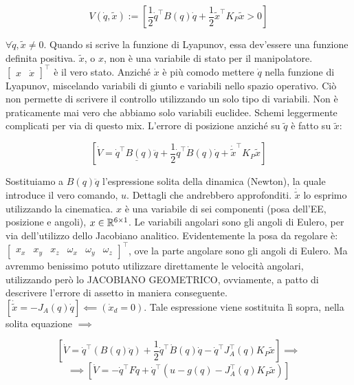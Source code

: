 \[
	V(\dot{q},\tilde{x}) := [\frac{1}{2}\dot{q}^\top B(q)\dot{q} + \frac{1}{2}\tilde{x}^\top K_P\tilde{x} > 0]
\]

$\forall \dot{q},\tilde{x}\neq 0$. Quando si scrive la funzione di Lyapunov, essa dev'essere una funzione definita positiva. $\tilde{x}$, o $x$, non è una variabile di stato per il manipolatore. $\begin{bmatrix}x&\dot{x}\end{bmatrix}^\top$ è il vero stato. Anziché $\dot{x}$ è più comodo mettere $\dot{q}$ nella funzione di Lyapunov, miscelando variabili di giunto e variabili nello spazio operativo. Ciò non permette di scrivere il controllo utilizzando un solo tipo di variabili. Non è praticamente mai vero che abbiamo solo variabili euclidee. Schemi leggermente complicati per via di questo mix. L'errore di posizione anziché su $\tilde{q}$ è fatto su $\tilde{x}$:

\[
	[\dot{V} = \underline{\dot{q}^\top B(q)\ddot{q}} + \frac{1}{2}\dot{q}^\top \dot{B}(q)\dot{q} + \dot{\tilde{x}}^\top K_P\tilde{x}]
\]

Sostituiamo a $B(q)\ddot{q}$ l'espressione solita della dinamica (Newton), la quale introduce il vero comando, $u$. Dettagli che andrebbero approfonditi. $\dot{\tilde{x}}$ lo esprimo utilizzando la cinematica. $x$ è una variabile di sei componenti (posa dell'EE, posizione e angoli), $x\in\mathbb{R}^{6\times 1}$. Le variabili angolari sono gli angoli di Eulero, per via dell'utilizzo dello Jacobiano analitico. Evidentemente la posa da regolare è: $\begin{bmatrix}x_x&x_y&x_z&\omega_x&\omega_y&\omega_z\end{bmatrix}^\top$, ove la parte angolare sono gli angoli di Eulero. Ma avremmo benissimo potuto utilizzare direttamente le velocità angolari, utilizzando però lo JACOBIANO GEOMETRICO, ovviamente, a patto di descrivere l'errore di assetto in maniera conseguente. $[\dot{\tilde{x}} = -J_A(q)\dot{q}]\impliedby(\dot{x}_d=0)$. Tale espressione viene sostituita lì sopra, nella solita equazione $\implies$

\[
	[\dot{V} = \dot{q}^\top(B(q)\ddot{q}) + \frac{1}{2}\dot{q}^\top \dot{B}(q)\dot{q} - \dot{q}^\top J_A^\top(q)K_P\tilde{x}] \implies
\]
\[
	\implies [\dot{V} = -\dot{q}^\top F\dot{q} + \dot{q}^\top(u-g(q)-J_A^\top(q)K_P\tilde{x})]
\]


